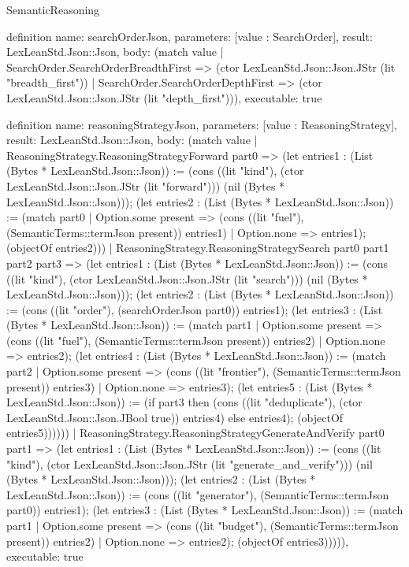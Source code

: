 \begin{lexlean}{SemanticReasoning}
\begin{semanticmodule}
definition{
  name: searchOrderJson,
  parameters: [value : SearchOrder],
  result: LexLeanStd.Json::Json,
  body: (match value
    | SearchOrder.SearchOrderBreadthFirst => (ctor LexLeanStd.Json::Json.JStr (lit "breadth_first"))
    | SearchOrder.SearchOrderDepthFirst => (ctor LexLeanStd.Json::Json.JStr (lit "depth_first"))),
  executable: true
}

definition{
  name: reasoningStrategyJson,
  parameters: [value : ReasoningStrategy],
  result: LexLeanStd.Json::Json,
  body: (match value
    | ReasoningStrategy.ReasoningStrategyForward part0 => (let entries1 : (List (Bytes * LexLeanStd.Json::Json)) := (cons ((lit "kind"), (ctor LexLeanStd.Json::Json.JStr (lit "forward"))) (nil (Bytes * LexLeanStd.Json::Json))); (let entries2 : (List (Bytes * LexLeanStd.Json::Json)) := (match part0
      | Option.some present => (cons ((lit "fuel"), (SemanticTerms::termJson present)) entries1)
      | Option.none => entries1); (objectOf entries2)))
    | ReasoningStrategy.ReasoningStrategySearch part0 part1 part2 part3 => (let entries1 : (List (Bytes * LexLeanStd.Json::Json)) := (cons ((lit "kind"), (ctor LexLeanStd.Json::Json.JStr (lit "search"))) (nil (Bytes * LexLeanStd.Json::Json))); (let entries2 : (List (Bytes * LexLeanStd.Json::Json)) := (cons ((lit "order"), (searchOrderJson part0)) entries1); (let entries3 : (List (Bytes * LexLeanStd.Json::Json)) := (match part1
      | Option.some present => (cons ((lit "fuel"), (SemanticTerms::termJson present)) entries2)
      | Option.none => entries2); (let entries4 : (List (Bytes * LexLeanStd.Json::Json)) := (match part2
      | Option.some present => (cons ((lit "frontier"), (SemanticTerms::termJson present)) entries3)
      | Option.none => entries3); (let entries5 : (List (Bytes * LexLeanStd.Json::Json)) := (if part3 then (cons ((lit "deduplicate"), (ctor LexLeanStd.Json::Json.JBool true)) entries4) else entries4); (objectOf entries5))))))
    | ReasoningStrategy.ReasoningStrategyGenerateAndVerify part0 part1 => (let entries1 : (List (Bytes * LexLeanStd.Json::Json)) := (cons ((lit "kind"), (ctor LexLeanStd.Json::Json.JStr (lit "generate_and_verify"))) (nil (Bytes * LexLeanStd.Json::Json))); (let entries2 : (List (Bytes * LexLeanStd.Json::Json)) := (cons ((lit "generator"), (SemanticTerms::termJson part0)) entries1); (let entries3 : (List (Bytes * LexLeanStd.Json::Json)) := (match part1
      | Option.some present => (cons ((lit "budget"), (SemanticTerms::termJson present)) entries2)
      | Option.none => entries2); (objectOf entries3))))),
  executable: true
}


\end{semanticmodule}
\end{lexlean}

